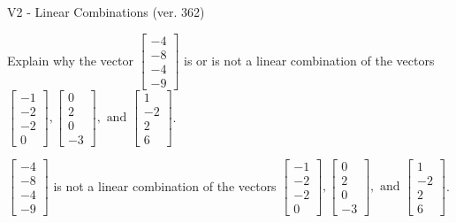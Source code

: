 \begin{exercise}
  \begin{exerciseTitle}V2 - Linear Combinations (ver. 362)\end{exerciseTitle}
  \begin{exerciseStatement}
    Explain why the vector \(\left[\begin{array}{c}
-4 \\
-8 \\
-4 \\
-9
\end{array}\right]\)  is or is not a linear 
	combination of the vectors \(\left[\begin{array}{c}
-1 \\
-2 \\
-2 \\
0
\end{array}\right] , \left[\begin{array}{c}
0 \\
2 \\
0 \\
-3
\end{array}\right] , \text{ and } \left[\begin{array}{c}
1 \\
-2 \\
2 \\
6
\end{array}\right]\).
	


  \end{exerciseStatement}
  \begin{exerciseAnswer}
   \(\left[\begin{array}{c}
-4 \\
-8 \\
-4 \\
-9
\end{array}\right]\) 
  	 is not  
	a linear combination of the vectors \(\left[\begin{array}{c}
-1 \\
-2 \\
-2 \\
0
\end{array}\right] , \left[\begin{array}{c}
0 \\
2 \\
0 \\
-3
\end{array}\right] , \text{ and } \left[\begin{array}{c}
1 \\
-2 \\
2 \\
6
\end{array}\right]\).

	
  


  \end{exerciseAnswer}
\end{exercise}